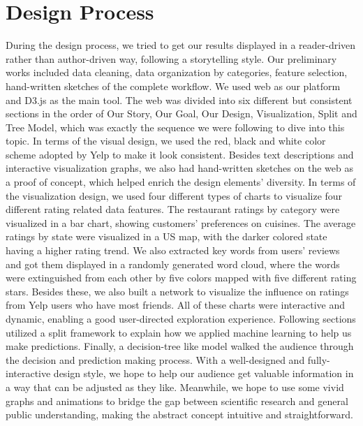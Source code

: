 \section{Design Process}
\label{sec:design} 


During the design process, we tried to get our results displayed in a reader-driven rather than author-driven way, following a storytelling style. Our preliminary works included data cleaning, data organization by categories, feature selection, hand-written sketches of the complete workflow. We used web as our platform and D3.js as the main tool. The web was divided into six different but consistent sections in the order of Our Story, Our Goal, Our Design, Visualization, Split and Tree Model, which was exactly the sequence we were following to dive into this topic. In terms of the visual design, we used the red, black and white color scheme adopted by Yelp to make it look consistent. Besides text descriptions and interactive visualization graphs, we also had hand-written sketches on the web as a proof of concept, which helped enrich the design elements' diversity. In terms of the visualization design, we used four different types of charts to visualize four different rating related data features. The restaurant ratings by category were visualized in a bar chart, showing customers' preferences on cuisines. The average ratings by state were visualized in a US map, with the darker colored state having a higher rating trend. We also extracted key words from users' reviews and got them displayed in a randomly generated word cloud, where the words were extinguished from each other by five colors mapped with five different rating stars. Besides these, we also built a network to visualize the influence on ratings from Yelp users who have most friends. All of these charts were interactive and dynamic, enabling a good user-directed exploration experience. Following sections utilized a split framework to explain how we applied machine learning to help us make predictions. Finally, a decision-tree like model walked the audience through the decision and prediction making process. With a well-designed and fully-interactive design style, we hope to help our audience get valuable information in a way that can be adjusted as they like. Meanwhile, we hope to use some vivid graphs and animations to bridge the gap between scientific research and general public understanding, making the abstract concept intuitive and straightforward.
